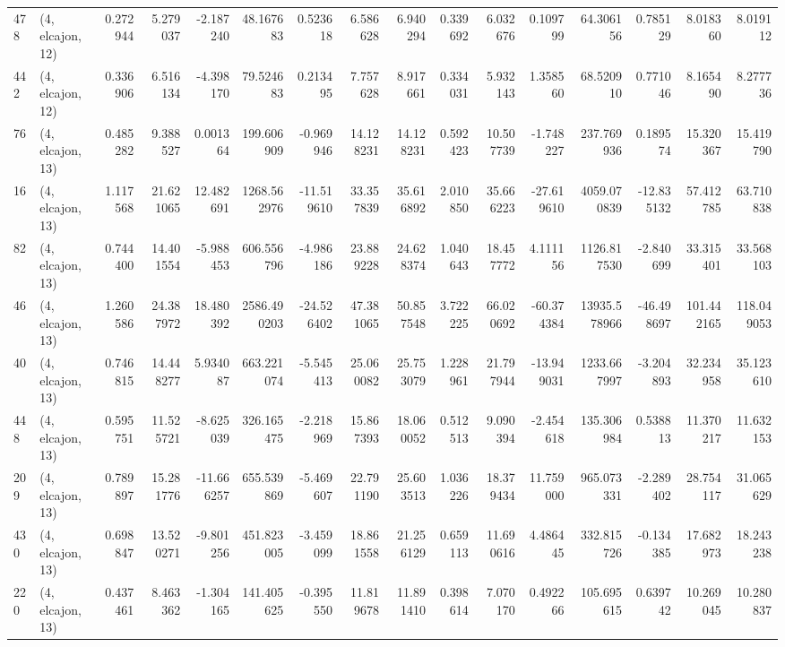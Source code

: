 \begin{tabular}{llrrrrrrrrrrrrrr}
478 &  (4, elcajon, 12) &   0.272944 &   5.279037 &  -2.187240 &    48.167683 &   0.523618 &   6.586628 &   6.940294 &  0.339692 &   6.032676 &   0.109799 &     64.306156 &   0.785129 &    8.018360 &    8.019112 \\
442 &  (4, elcajon, 12) &   0.336906 &   6.516134 &  -4.398170 &    79.524683 &   0.213495 &   7.757628 &   8.917661 &  0.334031 &   5.932143 &   1.358560 &     68.520910 &   0.771046 &    8.165490 &    8.277736 \\
76  &  (4, elcajon, 13) &   0.485282 &   9.388527 &   0.001364 &   199.606909 &  -0.969946 &  14.128231 &  14.128231 &  0.592423 &  10.507739 &  -1.748227 &    237.769936 &   0.189574 &   15.320367 &   15.419790 \\
16  &  (4, elcajon, 13) &   1.117568 &  21.621065 &  12.482691 &  1268.562976 & -11.519610 &  33.357839 &  35.616892 &  2.010850 &  35.666223 & -27.619610 &   4059.070839 & -12.835132 &   57.412785 &   63.710838 \\
82  &  (4, elcajon, 13) &   0.744400 &  14.401554 &  -5.988453 &   606.556796 &  -4.986186 &  23.889228 &  24.628374 &  1.040643 &  18.457772 &   4.111156 &   1126.817530 &  -2.840699 &   33.315401 &   33.568103 \\
46  &  (4, elcajon, 13) &   1.260586 &  24.387972 &  18.480392 &  2586.490203 & -24.526402 &  47.381065 &  50.857548 &  3.722225 &  66.020692 & -60.374384 &  13935.578966 & -46.498697 &  101.442165 &  118.049053 \\
40  &  (4, elcajon, 13) &   0.746815 &  14.448277 &   5.934087 &   663.221074 &  -5.545413 &  25.060082 &  25.753079 &  1.228961 &  21.797944 & -13.949031 &   1233.667997 &  -3.204893 &   32.234958 &   35.123610 \\
448 &  (4, elcajon, 13) &   0.595751 &  11.525721 &  -8.625039 &   326.165475 &  -2.218969 &  15.867393 &  18.060052 &  0.512513 &   9.090394 &  -2.454618 &    135.306984 &   0.538813 &   11.370217 &   11.632153 \\
209 &  (4, elcajon, 13) &   0.789897 &  15.281776 & -11.666257 &   655.539869 &  -5.469607 &  22.791190 &  25.603513 &  1.036226 &  18.379434 &  11.759000 &    965.073331 &  -2.289402 &   28.754117 &   31.065629 \\
430 &  (4, elcajon, 13) &   0.698847 &  13.520271 &  -9.801256 &   451.823005 &  -3.459099 &  18.861558 &  21.256129 &  0.659113 &  11.690616 &   4.486445 &    332.815726 &  -0.134385 &   17.682973 &   18.243238 \\
220 &  (4, elcajon, 13) &   0.437461 &   8.463362 &  -1.304165 &   141.405625 &  -0.395550 &  11.819678 &  11.891410 &  0.398614 &   7.070170 &   0.492266 &    105.695615 &   0.639742 &   10.269045 &   10.280837 \\

\end{tabular}
